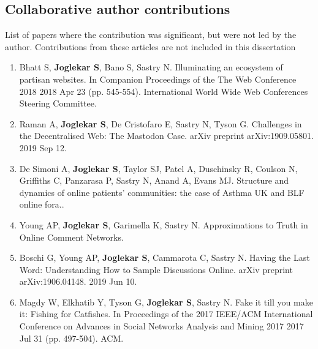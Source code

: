 \subsection{Collaborative author contributions}
List of papers where the contribution was significant, but were not led by the author. Contributions from these articles are not included in this dissertation

\begin{enumerate}
    \item Bhatt S, \textbf{Joglekar S}, Bano S, Sastry N. Illuminating an ecosystem of partisan websites. In Companion Proceedings of the The Web Conference 2018 2018 Apr 23 (pp. 545-554). International World Wide Web Conferences Steering Committee.
    
    \item Raman A, \textbf{Joglekar S}, De Cristofaro E, Sastry N, Tyson G. Challenges in the Decentralised Web: The Mastodon Case. arXiv preprint arXiv:1909.05801. 2019 Sep 12.
    
    \item De Simoni A, \textbf{Joglekar S}, Taylor SJ, Patel A, Duschinsky R, Coulson N, Griffiths C, Panzarasa P, Sastry N, Anand A, Evans MJ. Structure and dynamics of online patients’ communities: the case of Asthma UK and BLF online fora..
    
    \item Young AP, \textbf{Joglekar S}, Garimella K, Sastry N. Approximations to Truth in Online Comment Networks.
    
    \item Boschi G, Young AP, \textbf{Joglekar S}, Cammarota C, Sastry N. Having the Last Word: Understanding How to Sample Discussions Online. arXiv preprint arXiv:1906.04148. 2019 Jun 10.
    
    \item Magdy W, Elkhatib Y, Tyson G, \textbf{Joglekar S}, Sastry N. Fake it till you make it: Fishing for Catfishes. In Proceedings of the 2017 IEEE/ACM International Conference on Advances in Social Networks Analysis and Mining 2017 2017 Jul 31 (pp. 497-504). ACM.    
   
\end{enumerate}


